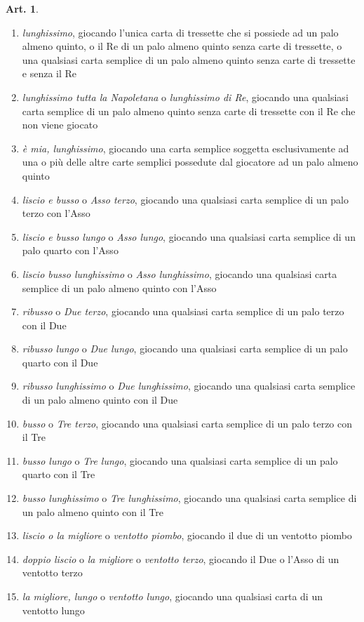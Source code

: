 \documentclass[italian,a4paper]{article}
\theoremstyle{definition}
\newtheorem{art}{Art.}
\begin{document}
\begin{art}
\begin{enumerate}
\item \emph{lunghissimo},  giocando l'unica carta di tressette che si possiede ad un palo almeno quinto, o il Re di un palo almeno quinto senza carte di tressette, o una qualsiasi carta semplice di un palo almeno quinto senza carte di tressette e senza il Re
\item \emph{lunghissimo tutta la Napoletana} o \emph{lunghissimo di Re},  giocando una qualsiasi carta semplice di un palo almeno quinto senza carte di tressette con il Re che non viene giocato
\item \emph{è mia, lunghissimo},  giocando una carta semplice soggetta esclusivamente ad una o più delle altre carte semplici possedute dal giocatore ad un palo almeno quinto
\item \emph{liscio e busso} o \emph{Asso terzo},  giocando una qualsiasi carta semplice di un palo terzo con l'Asso
\item \emph{liscio e busso lungo} o \emph{Asso lungo},  giocando una qualsiasi carta semplice di un palo quarto con l'Asso
\item \emph{liscio  busso lunghissimo} o \emph{Asso lunghissimo},  giocando una qualsiasi carta semplice di un palo almeno quinto con l'Asso
\item \emph{ribusso} o \emph{Due terzo},  giocando una qualsiasi carta semplice di un palo terzo con il Due
\item \emph{ribusso lungo} o \emph{Due lungo},  giocando una qualsiasi carta semplice di un palo quarto con il Due
\item \emph{ribusso lunghissimo} o \emph{Due lunghissimo},  giocando una qualsiasi carta semplice di un palo almeno quinto con il Due
\item \emph{busso} o \emph{Tre terzo},  giocando una qualsiasi carta semplice di un palo terzo con il Tre
\item \emph{busso lungo} o \emph{Tre lungo},  giocando una qualsiasi carta semplice di un palo quarto con il Tre
\item \emph{busso lunghissimo} o \emph{Tre lunghissimo},  giocando una qualsiasi carta semplice di un palo almeno quinto con il Tre
\item \emph{liscio o la migliore} o \emph{ventotto piombo},  giocando il due di un ventotto piombo
\item \emph{doppio liscio} o \emph{la migliore} o \emph{ventotto terzo},  giocando il Due o l'Asso di un ventotto terzo
\item \emph{la migliore, lungo} o \emph{ventotto lungo},  giocando una qualsiasi carta di un ventotto lungo

\end{enumerate}
\end{art}
\end{document}
